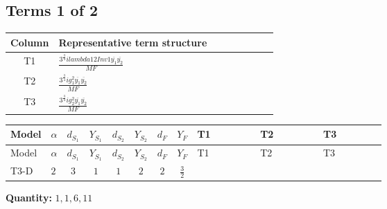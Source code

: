 \documentclass[8pt]{article}
\begin{document}
\begin{landscape}
\subsection*{Terms 1 of 2}
\begin{center}
\begin{tabular}{@{}c >{\raggedright\arraybackslash}p{0.82\linewidth}@{}}
\toprule
Column & Representative term structure \\
\midrule
T1 & \(\displaystyle \frac{3^{\frac{3}{4}} i lambda12Inv1 \overline{y_{1}} \overline{y_{2}}}{MF}\) \\
\midrule
T2 & \(\displaystyle \frac{3^{\frac{3}{4}} i g_{1}^{2} \overline{y_{1}} \overline{y_{2}}}{MF}\) \\
\midrule
T3 & \(\displaystyle \frac{3^{\frac{3}{4}} i g_{2}^{2} \overline{y_{1}} \overline{y_{2}}}{MF}\) \\
\midrule
\bottomrule
\end{tabular}
\end{center}
\smallskip
\tiny
\begin{longtable}{@{}llcccccc >{\raggedright\arraybackslash}p{0.21\linewidth} >{\raggedright\arraybackslash}p{0.21\linewidth} >{\raggedright\arraybackslash}p{0.21\linewidth}@{}}
\toprule
Model & $\alpha$ & $d_{S_1}$ & $Y_{S_1}$ & $d_{S_2}$ & $Y_{S_2}$ & $d_F$ & $Y_F$ & T1 & T2 & T3 \\
\midrule
\endfirsthead
\toprule
Model & $\alpha$ & $d_{S_1}$ & $Y_{S_1}$ & $d_{S_2}$ & $Y_{S_2}$ & $d_F$ & $Y_F$ & T1 & T2 & T3 \\
\midrule
\endhead
T3-D & $2$ & $3$ & $1$ & $1$ & $2$ & $2$ & $\frac{3}{2}$ & \scriptsize\adjustbox{max width=\linewidth}{$\begin{gathered} \frac{3^{\frac{3}{4}} i lambda12Inv1 \overline{y_{1}} \overline{y_{2}}}{6 MF}\end{gathered}$} & \scriptsize\adjustbox{max width=\linewidth}{$\begin{gathered} \frac{9 \cdot 3^{\frac{3}{4}} i g_{1}^{2} \overline{y_{1}} \overline{y_{2}}}{8 MF}\end{gathered}$} & \scriptsize\adjustbox{max width=\linewidth}{$\begin{gathered} \frac{17 \cdot 3^{\frac{3}{4}} i g_{2}^{2} \overline{y_{1}} \overline{y_{2}}}{24 MF}\end{gathered}$} \\
\midrule
\bottomrule
\end{longtable}
\clearpage
\noindent\textbf{Quantity: }$\mathrm{1,1,6,11}$\par\smallskip

\end{landscape}
\end{document}
